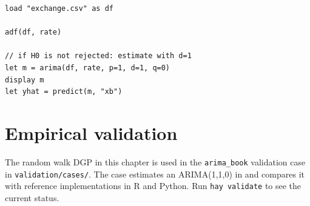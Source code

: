 \begin{lstlisting}[caption={Typical workflow with real data}]
load "exchange.csv" as df

adf(df, rate)

// if H0 is not rejected: estimate with d=1
let m = arima(df, rate, p=1, d=1, q=0)
display m
let yhat = predict(m, "xb")
\end{lstlisting}

\section{Empirical validation}

The random walk DGP in this chapter is used in the \texttt{arima\_book}
validation case in \texttt{validation/cases/}. The case estimates an
ARIMA(1,1,0) in \hayashi{} and compares it with reference implementations in
R and Python. Run \lstinline{hay validate} to see the current status.
